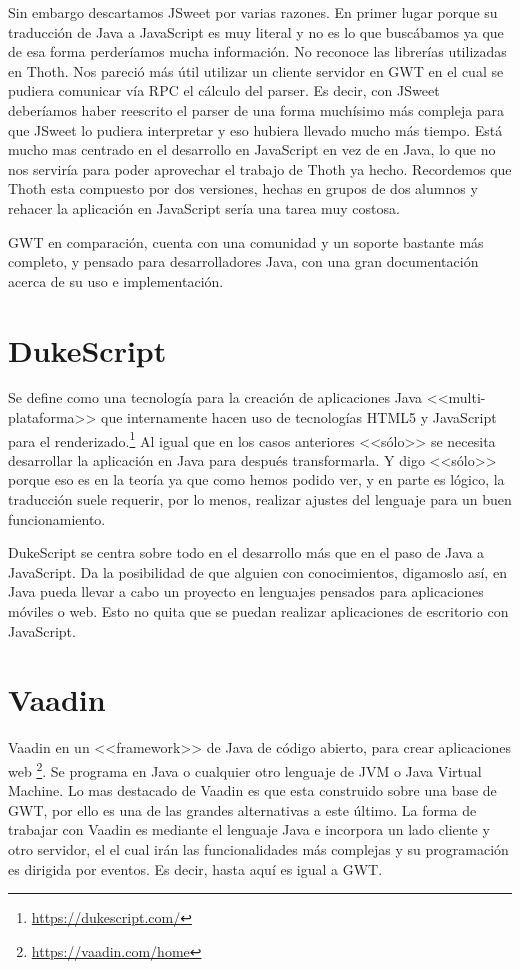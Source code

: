 Sin embargo descartamos JSweet por varias razones. En primer lugar porque su traducción de Java a JavaScript es muy literal y no es lo que buscábamos ya que de esa forma perderíamos mucha información.	No reconoce las librerías utilizadas en Thoth. Nos pareció más útil utilizar un cliente servidor en GWT en el cual se pudiera comunicar vía RPC el cálculo del parser. Es decir, con JSweet deberíamos haber reescrito el parser de una forma muchísimo más compleja para que JSweet lo pudiera interpretar y eso hubiera llevado mucho más tiempo. Está mucho mas centrado en el desarrollo en JavaScript en vez de en Java, lo que no nos serviría para poder aprovechar el trabajo de Thoth ya hecho. Recordemos que Thoth esta compuesto por dos versiones, hechas en grupos de dos alumnos y rehacer la aplicación en JavaScript sería una tarea muy costosa.

GWT en comparación, cuenta con una comunidad y un soporte bastante más completo, y pensado para desarrolladores Java, con una gran documentación acerca de su uso e implementación.

\section{DukeScript}

Se define como una tecnología para la creación de aplicaciones Java <<multi-plataforma>> que internamente hacen uso de tecnologías HTML5 y JavaScript para el renderizado.\footnote{\url{https://dukescript.com/}}
Al igual que en los casos anteriores <<sólo>> se necesita desarrollar la aplicación en Java para después transformarla. Y digo <<sólo>> porque eso es en la teoría ya que como hemos podido ver, y en parte es lógico, la traducción suele requerir, por lo menos, realizar ajustes del lenguaje para un buen funcionamiento.

DukeScript se centra sobre todo en el desarrollo más que en el paso de Java a JavaScript. Da la posibilidad de que alguien con conocimientos, digamoslo así, en Java pueda llevar a cabo un proyecto en lenguajes pensados para aplicaciones móviles o web. Esto no quita que se puedan realizar aplicaciones de escritorio con JavaScript.

\section{Vaadin}

Vaadin en un <<framework>> de Java de código abierto, para crear aplicaciones web \footnote{\url{https://vaadin.com/home}}. Se programa en Java o cualquier otro lenguaje de JVM o Java Virtual Machine. Lo mas destacado de Vaadin es que esta construido sobre una base de GWT, por ello es una de las grandes alternativas a este último. La forma de trabajar con Vaadin es mediante el lenguaje Java e incorpora un lado cliente y otro servidor, el el cual irán las funcionalidades más complejas y su programación es dirigida por eventos. Es decir, hasta aquí es igual a GWT.

